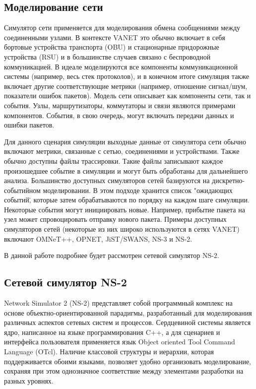 \subsection*{Моделирование сети}

Симулятор сети применяется для моделирования обмена сообщениями между соединенными узлами. В контексте VANET это обычно включает в себя бортовые устройства транспорта (OBU) и стационарные придорожные устройства (RSU) и в большинстве случаев связано с беспроводной коммуникацией. В идеале моделируются все компоненты коммуникационной системы (например, весь стек протоколов), и в конечном итоге симуляция также включает другие соответствующие метрики (например, отношение сигнал/шум, показатели ошибок пакетов). Модель сети описывает как компоненты сети, так и события. Узлы, маршрутизаторы, коммутаторы и связи являются примерами компонентов. События, в свою очередь, могут включать передачи данных и ошибки пакетов.

Для данного сценария симуляции выходные данные от симулятора сети обычно включают метрики, связанные с сетью, соединениями и устройствами. Также обычно доступны файлы трассировки. Такие файлы записывают каждое произошедшее событие в симуляции и могут быть обработаны для дальнейшего анализа. Большинство доступных симуляторов сетей базируются на дискретно-событийном моделировании. В этом подходе хранится список "ожидающих событий\", которые затем обрабатываются по порядку на каждом шаге симуляции. Некоторые события могут инициировать новые. Например, прибытие пакета на узел может спровоцировать отправку нового пакета. Примеры доступных симуляторов сетей (некоторые из них широко используются в сетях VANET) включают OMNeT++, OPNET, JiST/SWANS, NS-3 и NS-2.

В данной работе подробнее будет рассмотрен сетевой симулятор NS-2.

\subsection*{Сетевой симулятор NS-2}

Network Simulator 2 (NS-2) представляет собой программный комплекс на основе объектно-ориентированной парадигмы, разработанный для моделирования различных аспектов сетевых систем и процессов. Сердцевиной системы является ядро, написанное на языке программирования C++, а для сценариев и интерфейса пользователя применяется язык Object oriented Tool Command Language (OTcl). Наличие классовой структуры и иерархии, которая поддерживается обоими языками, позволяет удобно организовать моделирование, сохраняя при этом однозначное соответствие между элементами разработки на разных уровнях.

